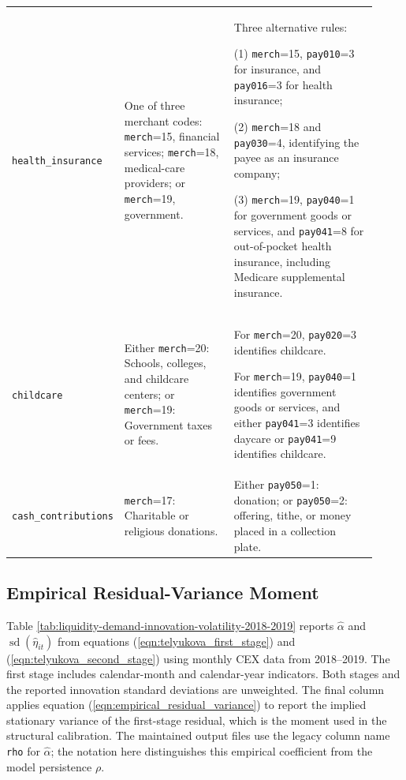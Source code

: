 \documentclass[11pt]{article}
\newcommand{\code}[1]{\nolinkurl{#1}}
\begin{document}
\begin{landscape}
\begin{longtable}{
			>{\RaggedRight\arraybackslash}p{0.20\linewidth}
			>{\RaggedRight\arraybackslash}p{0.31\linewidth}
			>{\RaggedRight\arraybackslash}p{0.41\linewidth}
		}
		\code{health_insurance} &
		One of three merchant codes:
		\code{merch}=15, financial services;
		\code{merch}=18, medical-care providers; or
		\code{merch}=19, government. &
		Three alternative rules:
		
		(1) \code{merch}=15, \code{pay010}=3 for insurance, and
		\code{pay016}=3 for health insurance;
		
		(2) \code{merch}=18 and \code{pay030}=4, identifying the payee as an
		insurance company;
		
		(3) \code{merch}=19, \code{pay040}=1 for government goods or services,
		and \code{pay041}=8 for out-of-pocket health insurance, including
		Medicare supplemental insurance. \\
		
		\code{childcare} &
		Either \code{merch}=20: Schools, colleges, and childcare centers; or
		\code{merch}=19: Government taxes or fees. &
		For \code{merch}=20, \code{pay020}=3 identifies childcare.
		
		For \code{merch}=19, \code{pay040}=1 identifies government goods or
		services, and either \code{pay041}=3 identifies daycare or
		\code{pay041}=9 identifies childcare. \\
		
		\code{cash_contributions} &
		\code{merch}=17: Charitable or religious donations. &
		Either \code{pay050}=1: donation; or
		\code{pay050}=2: offering, tithe, or money placed in a collection plate. \\
		
	\end{longtable}
\end{landscape}

\subsection{Empirical Residual-Variance Moment}

Table \ref{tab:liquidity-demand-innovation-volatility-2018-2019} reports $\widehat{\alpha}$ and $\operatorname{sd}(\widehat{\eta}_{it})$ from equations (\ref{eqn:telyukova_first_stage}) and (\ref{eqn:telyukova_second_stage}) using monthly CEX data from 2018--2019. The first stage includes calendar-month and calendar-year indicators. Both stages and the reported innovation standard deviations are unweighted. The final column applies equation (\ref{eqn:empirical_residual_variance}) to report the implied stationary variance of the first-stage residual, which is the moment used in the structural calibration. The maintained output files use the legacy column name \lstinline|rho| for $\widehat{\alpha}$; the notation here distinguishes this empirical coefficient from the model persistence $\rho$.
\end{document}
